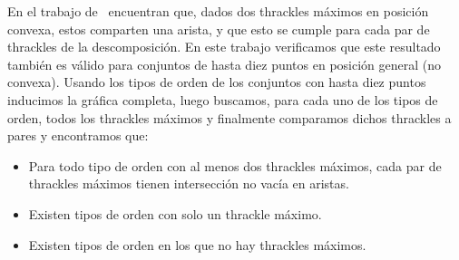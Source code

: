   En el trabajo de~\cite{Fabila-Monroy2018} encuentran que, dados dos thrackles
  máximos en posición convexa, estos comparten una arista, y que esto se cumple
  para cada par de thrackles de la descomposición. En este trabajo verificamos
  que este resultado también es válido para conjuntos de hasta diez puntos en
  posición general (no convexa). Usando los tipos de orden de los conjuntos
  con hasta diez puntos inducimos la gráfica completa, luego buscamos, para
  cada uno de los tipos de orden, todos los thrackles máximos y
  finalmente comparamos dichos thrackles a pares y encontramos que:
  \begin{itemize}
    \item Para todo tipo de orden con al menos dos thrackles máximos, cada par de thrackles máximos tienen intersección no vacía en aristas.
    \item Existen tipos de orden con solo un thrackle máximo.
    \item Existen tipos de orden en los que no hay thrackles máximos.
  \end{itemize}

